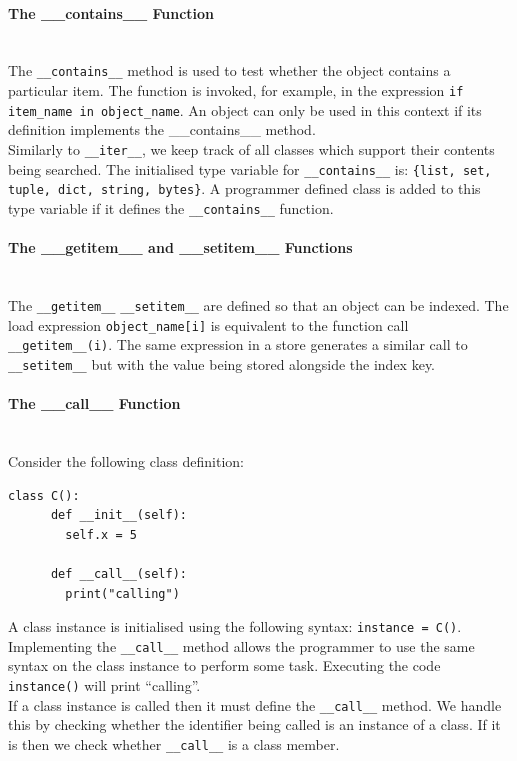 \documentclass[12pt, titlepage]{article}
\begin{document}
\paragraph*{The \_\_contains\_\_ Function}\mbox{} \\
The \texttt{\_\_contains\_\_} method is used to test whether the object contains a particular item. The function is invoked, for example, in the expression \texttt{if item\_name in object\_name}. An object can only be used in this context if its definition implements the \_\_contains\_\_ method. \\
\indent Similarly to \texttt{\_\_iter\_\_}, we keep track of all classes which support their contents being searched. The initialised type variable for \texttt{\_\_contains\_\_} is: \texttt{\{list, set, tuple, dict, string, bytes\}}. A programmer defined class is added to this type variable if it defines the \texttt{\_\_contains\_\_} function.

\paragraph*{The \_\_getitem\_\_ and \_\_setitem\_\_ Functions}\mbox{} \\
The \texttt{\_\_getitem\_\_} \texttt{\_\_setitem\_\_} are defined so that an object can be indexed. The load expression \texttt{object\_name[i]} is equivalent to the function call \texttt{\_\_getitem\_\_(i)}. The same expression in a store generates a similar call to \texttt{\_\_setitem\_\_} but with the value being stored alongside the index key.

\paragraph*{The \_\_call\_\_ Function} \mbox{} \\
Consider the following class definition:
\begin{lstlisting}[mathescape]
    class C():
      def __init__(self):
        self.x = 5
			
      def __call__(self):
        print("calling")
\end{lstlisting}
A class instance is initialised using the following syntax: \texttt{instance = C()}. Implementing the \texttt{\_\_call\_\_} method allows the programmer to use the same syntax on the class instance to perform some task. Executing the code \texttt{instance()} will print ``calling''. \\
\indent If a class instance is called then it must define the \texttt{\_\_call\_\_} method. We handle this by checking whether the identifier being called is an instance of a class. If it is then we check whether \texttt{\_\_call\_\_} is a class member.
\end{document}
